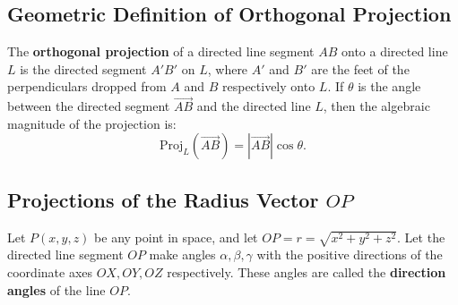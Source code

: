 \subsection{Geometric Definition of Orthogonal Projection}
The \textbf{orthogonal projection} of a directed line segment $AB$ onto a directed line $L$ is the directed segment $A'B'$ on $L$, where $A'$ and $B'$ are the feet of the perpendiculars dropped from $A$ and $B$ respectively onto $L$.
If $\theta$ is the angle between the directed segment $\vec{AB}$ and the directed line $L$, then the algebraic magnitude of the projection is:
\begin{equation}
    \text{Proj}_L(\vec{AB}) = |\vec{AB}|\cos\theta.
\end{equation}

\subsection{Projections of the Radius Vector $OP$}
Let $P(x,y,z)$ be any point in space, and let $OP = r = \sqrt{x^2+y^2+z^2}$.
Let the directed line segment $OP$ make angles $\alpha, \beta, \gamma$ with the positive directions of the coordinate axes $OX, OY, OZ$ respectively. These angles are called the \textbf{direction angles} of the line $OP$.

\begin{center}
\end{center}

